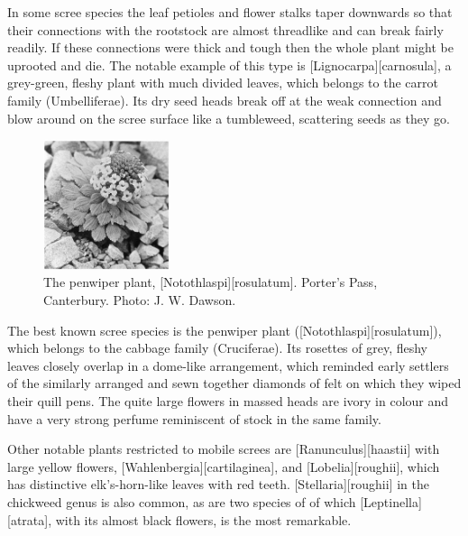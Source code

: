 In some scree species the leaf petioles and flower stalks taper downwards so that their connections with the rootstock are almost threadlike and can break fairly readily.
If these connections were thick and tough then the whole plant might be uprooted and die.
The notable example of this type is [Lignocarpa][carnosula], a grey-green, fleshy plant with much divided leaves, which belongs to the carrot family (Umbelliferae).
Its dry seed heads break off at the weak connection and blow around on the scree surface like a tumbleweed, scattering seeds as they go.

\begin{figure}
	\includegraphics[width=0.33\textwidth]{graphics/figure112penwiper.jpg}
	\centering
	\caption[The penwiper plant]{The penwiper plant, [Notothlaspi][rosulatum].
Porter's Pass, Canterbury.
	Photo: J. W. Dawson.}%
	\label{fig:112penwiper}
\end{figure}

The best known scree species is the penwiper plant ([Notothlaspi][rosulatum]), which belongs to the cabbage family (Cruciferae).
Its rosettes of grey, fleshy leaves closely overlap in a dome-like arrangement, which reminded early settlers of the similarly arranged and sewn together diamonds of felt on which they wiped their quill pens.
The quite large flowers in massed heads are ivory in colour and have a very strong perfume reminiscent of stock in the same family.

Other notable plants restricted to mobile screes are [Ranunculus][haastii] with large yellow flowers, [Wahlenbergia][cartilaginea], and [Lobelia][roughii], which has distinctive elk's-horn-like leaves with red teeth. [Stellaria][roughii] in the chickweed genus is also common, as are two species of  of which [Leptinella][atrata], with its almost black flowers, is the most remarkable.

